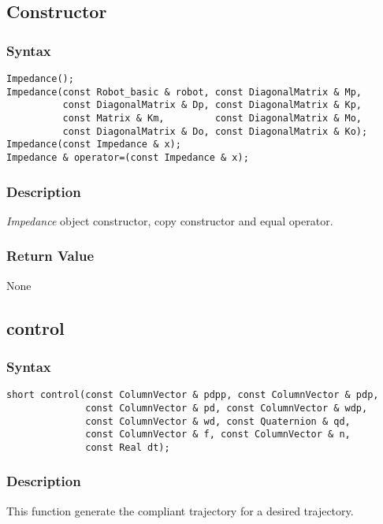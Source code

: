 \documentclass[dvips,11pt,fleqn]{report}
\begin{document}
\subsection*{Constructor}
\subsubsection*{Syntax}
\begin{verbatim}
Impedance();
Impedance(const Robot_basic & robot, const DiagonalMatrix & Mp, 
          const DiagonalMatrix & Dp, const DiagonalMatrix & Kp, 
          const Matrix & Km,         const DiagonalMatrix & Mo, 
          const DiagonalMatrix & Do, const DiagonalMatrix & Ko);
Impedance(const Impedance & x);
Impedance & operator=(const Impedance & x);
\end{verbatim}

\subsubsection*{Description}   
\emph{Impedance} object constructor, copy constructor and equal
operator.

\subsubsection*{Return Value}

None

\newpage

\subsection*{control}
\subsubsection*{Syntax}
\begin{verbatim}
short control(const ColumnVector & pdpp, const ColumnVector & pdp,
              const ColumnVector & pd, const ColumnVector & wdp,
              const ColumnVector & wd, const Quaternion & qd, 
              const ColumnVector & f, const ColumnVector & n,
              const Real dt); 
\end{verbatim}

\subsubsection*{Description}   
This function generate the compliant trajectory for a desired
trajectory.
\end{document}
